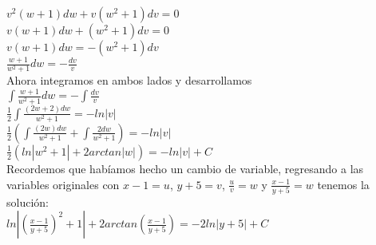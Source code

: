 $v^{2}(w+1)dw + v(w^{2} + 1)dv= 0$\\
    
$v(w+1)dw + (w^{2}+1)dv= 0$\\
    
$v(w+1)dw = -(w^{2}+1)dv$\\
    
$\frac{w+1}{w^{2}+1} dw= - \frac{dv}{v}$\\

Ahora integramos en ambos lados y desarrollamos\\ 

$\int \frac{w+1}{w^{2}+1} dw= - \int \frac{dv}{v}$\\

$\frac{1}{2} \int \frac{(2w+2)dw}{w^{2}+1}= -ln |v| $\\

$\frac{1}{2}(\int \frac{(2w)dw}{w^{2}+1}+ \int \frac{2dw}{w^{2}+1})= -ln |v|$\\

$\frac{1}{2}(ln|w^{2}+1|+ 2arctan |w|)= -ln|v|+ C$\\

Recordemos que habíamos hecho un cambio de variable, regresando a las variables originales con $x-1=u$, $y+5=v$, $\frac{u}{v}=w$ y $\frac{x-1}{y+5}=w$ tenemos la solución:\\

$ln|(\frac{x-1}{y+5})^{2}+1|+ 2arctan(\frac{x-1}{y+5})=-2ln |y+5|+ C$\\

